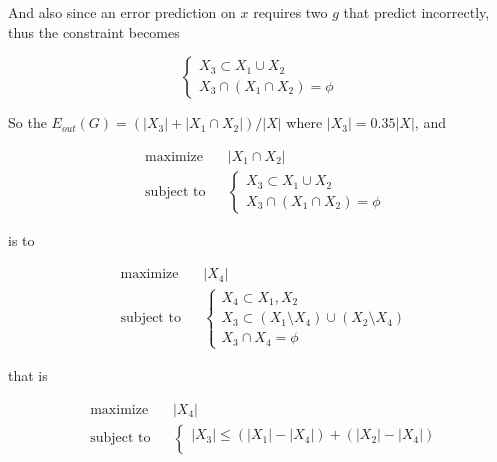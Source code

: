 \documentclass[fleqn,a4paper,12pt]{article}
\begin{document}
And also since an error prediction on $x$ requires two $g$ that predict incorrectly, thus the constraint becomes

\begin{equation*}
  \begin{cases}
    X_3 \subset X_1 \cup X_2 \\
    X_3 \cap (X_1 \cap X_2) = \phi 
  \end{cases}
\end{equation*}

So the $E_{out}(G) = (|X_3| + |X_1 \cap X_2|) / |X|$ where $|X_3| = 0.35 |X|$, and

\begin{equation*}
  \begin{aligned}
    & \text{maximize} && |X_1 \cap X_2| \\
    & \text{subject to} && 
    \begin{cases}
      X_3 \subset X_1 \cup X_2 \\
      X_3 \cap (X_1 \cap X_2) = \phi 
    \end{cases}
  \end{aligned}
\end{equation*}

is to

\begin{equation*}
  \begin{aligned}
    & \text{maximize} && |X_4| \\
    & \text{subject to} && 
    \begin{cases}
      X_4 \subset X_1, X_2 \\
      X_3 \subset (X_1 \setminus X_4) \cup (X_2 \setminus X_4) \\
      X_3 \cap X_4 = \phi 
    \end{cases}
  \end{aligned}
\end{equation*}

that is 

\begin{equation*}
  \begin{aligned}
    & \text{maximize} && |X_4| \\
    & \text{subject to} && 
    \begin{cases}
      |X_3| \leq (|X_1| - |X_4|)  + (|X_2| - |X_4|) \\
    \end{cases}
  \end{aligned}
\end{equation*}
\end{document}
